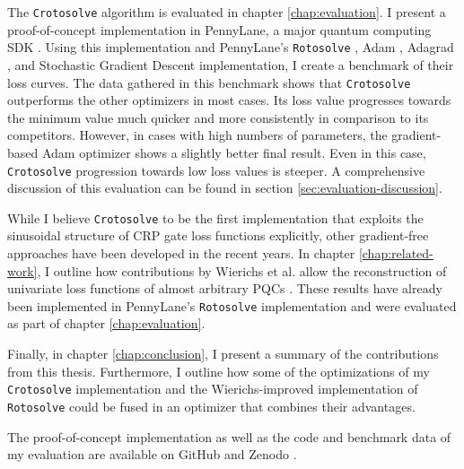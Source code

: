 The \texttt{Crotosolve} algorithm is evaluated in chapter \ref{chap:evaluation}.
I present a proof-of-concept implementation in PennyLane, a major quantum
computing SDK \cite{bergholm_pennylane_2018,unitary_fund_team_results_2022}.
Using this implementation and PennyLane's
\texttt{Rotosolve} \cite{ostaszewski_structure_2021},
Adam \cite{kingma_adam_2017},
Adagrad \cite{duchi_adaptive_2011}, and
Stochastic Gradient Descent implementation, I create a benchmark of their loss
curves.
The data gathered in this benchmark shows that \texttt{Crotosolve} outperforms
the other optimizers in most cases.
Its loss value progresses towards the minimum value much quicker and more
consistently in comparison to its competitors.
However, in cases with high numbers of parameters, the gradient-based Adam
optimizer shows a slightly better final result.
Even in this case, \texttt{Crotosolve} progression towards low loss values is
steeper. 
A comprehensive discussion of this evaluation can be found in section
\ref{sec:evaluation-discussion}.

While I believe \texttt{Crotosolve} to be the first implementation that exploits
the sinusoidal structure of CRP gate loss functions explicitly, other
gradient-free approaches have been developed in the recent years.
In chapter \ref{chap:related-work}, I outline how contributions by
Wierichs et al. allow the reconstruction of univariate loss functions of almost
arbitrary PQCs \cite{wierichs_general_2022}.
These results have already been implemented in PennyLane's \texttt{Rotosolve}
implementation and were evaluated as part of chapter \ref{chap:evaluation}.

Finally, in chapter \ref{chap:conclusion}, I present a summary of the
contributions from this thesis.
Furthermore, I outline how some of the optimizations of my \texttt{Crotosolve}
implementation and the Wierichs-improved implementation of \texttt{Rotosolve}
could be fused in an optimizer that combines their advantages.

The proof-of-concept implementation as well as the code and benchmark data of my
evaluation are available on GitHub and Zenodo
\cite{schweikart_schweikartcrotosolve_2023}.
